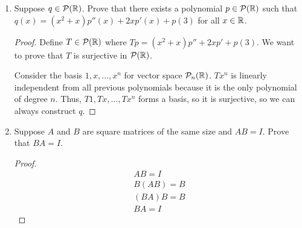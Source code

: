 \begin{enumerate}
    \item[20] Suppose $q \in \mathcal P(\mathbb{R})$. Prove that there exists a polynomial $p \in \mathcal P(\mathbb{R})$ such that $q(x) = (x^2 + x)p''(x) + 2xp'(x) + p(3)$ for all $x \in \mathbb{R}$.
    
    \begin{proof}
        Define $T \in \mathcal P(\mathbb{R})$ where $Tp = (x^2 + x)p'' + 2xp' + p(3)$. We want to prove that $T$ is surjective in $\mathcal P(\mathbb{R})$.

        Consider the basis $1, x, \dots, x^n$ for vector space $\mathcal P_n(\mathbb{R})$. $Tx^n$ is linearly independent from all previous polynomials because it is the only polynomial of degree $n$. Thus, $T1, Tx, \dots, Tx^n$ forms a basis, so it is surjective, so we can always construct $q$.
    \end{proof}

    \item[24] Suppose $A$ and $B$ are square matrices of the same size and $AB = I$. Prove that $BA = I$.
    
    \begin{proof}
        \begin{align*}
            AB = I \\
            B(AB) = B \\
            (BA)B = B \\
            BA = I 
        \end{align*}
    \end{proof}
\end{enumerate}